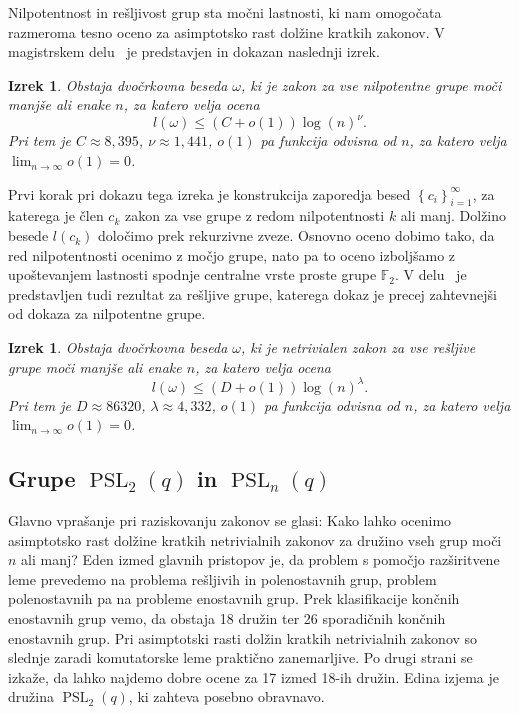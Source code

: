 \documentclass[12pt,a4paper]{article}
\newcounter{theoremcounter}[section] %
\newtheorem{izrek}[theoremcounter]{Izrek}
\newtheorem{definicija}[theoremcounter]{Definicija}
\begin{document}
Nilpotentnost in rešljivost grup sta močni lastnosti, ki nam omogočata razmeroma tesno oceno za asimptotsko rast dolžine kratkih zakonov. 
V magistrskem delu~\cite{Schneider_2016} je predstavjen in dokazan naslednji izrek.
\begin{izrek}
Obstaja dvočrkovna beseda $\omega$, ki je zakon za vse nilpotentne grupe moči manjše ali enake $n$, za katero velja ocena \begin{equation*}
l(\omega) \le (C + o(1)) \log(n)^{\nu}. 
\end{equation*}  
Pri tem je $C \approx 8,395$, $\nu \approx 1,441$, $o(1)$ pa funkcija odvisna od $n$, za katero velja $\lim_{n \to \infty} o(1) = 0$. 
\end{izrek}
\noindent
Prvi korak pri dokazu tega izreka je konstrukcija zaporedja besed $\left\{ c_i \right\}_{i = 1}^{\infty}$, za katerega je člen $c_k$ zakon za
vse grupe z redom nilpotentnosti $k$ ali manj. Dolžino besede $l(c_k)$ določimo prek rekurzivne zveze. Osnovno oceno dobimo tako, da red nilpotentnosti ocenimo z močjo grupe, nato pa to oceno izboljšamo z upoštevanjem lastnosti spodnje centralne
vrste proste grupe $\mathbb{F}_2$.
\noindent
V delu~\cite{Schneider_2016} je predstavljen tudi rezultat za rešljive grupe, katerega dokaz je precej zahtevnejši od dokaza za nilpotentne grupe.
\begin{izrek}
    Obstaja dvočrkovna beseda $\omega$, ki je netrivialen zakon za vse rešljive grupe moči manjše ali enake $n$, za katero velja ocena \begin{equation*}
    l(\omega) \le (D + o(1)) \log(n)^{\lambda}. 
    \end{equation*}  
    Pri tem je $D \approx 86320$, $\lambda \approx 4,332$, $o(1)$ pa funkcija odvisna od $n$, za katero velja $\lim_{n \to \infty} o(1) = 0$. 
    \end{izrek}

\subsection{Grupe $\operatorname{PSL}_2(q)$ in $\operatorname{PSL}_n(q)$}

Glavno vprašanje pri raziskovanju zakonov se glasi: Kako lahko ocenimo asimptotsko rast dolžine kratkih netrivialnih zakonov za družino vseh grup moči $n$ ali manj?
Eden izmed glavnih pristopov je, da problem s pomočjo razširitvene leme prevedemo na problema rešljivih in polenostavnih grup, problem polenostavnih pa na probleme enostavnih grup.
Prek klasifikacije končnih enostavnih grup vemo, da obstaja 18 družin ter 26 sporadičnih končnih enostavnih grup. Pri asimptotski rasti dolžin kratkih netrivialnih zakonov so slednje zaradi komutatorske leme praktično zanemarljive. Po drugi strani se izkaže, da lahko najdemo dobre ocene za 17 izmed 18-ih družin.
Edina izjema je družina $\operatorname{PSL}_2(q)$, ki zahteva posebno obravnavo.
\end{document}
